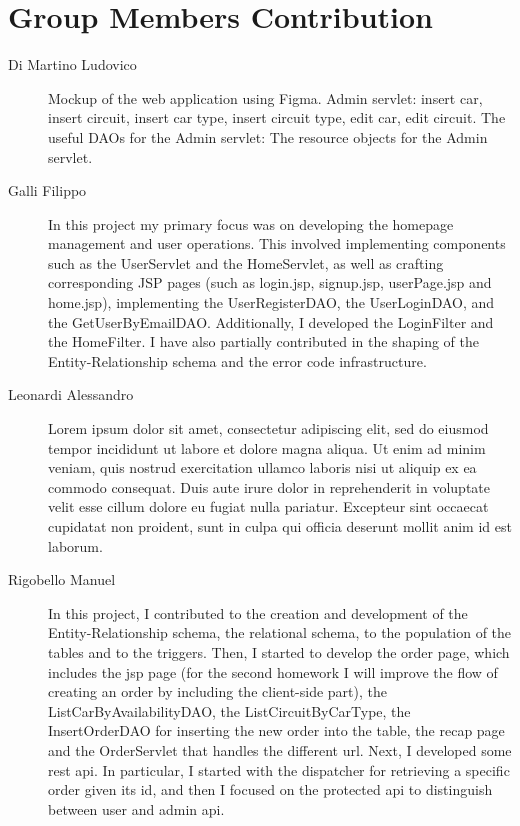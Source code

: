 \section{Group Members Contribution}


\begin{description}
	\item[Di Martino Ludovico] Mockup of the web application using Figma. Admin servlet: insert car, insert circuit, insert car type, insert circuit type, edit car, edit circuit. The useful DAOs for the Admin servlet: The resource objects for the Admin servlet.
	\item[Galli Filippo] In this project my primary focus was on developing the homepage management and user operations. This involved implementing components such as the UserServlet and the HomeServlet, as well as crafting corresponding JSP pages (such as login.jsp, signup.jsp, userPage.jsp and home.jsp), implementing the UserRegisterDAO, the UserLoginDAO, and the GetUserByEmailDAO. Additionally, I developed the LoginFilter and the HomeFilter. I have also partially contributed in the shaping of the Entity-Relationship schema and the error code infrastructure.
	\item[Leonardi Alessandro] Lorem ipsum dolor sit amet, consectetur adipiscing elit, sed do eiusmod tempor incididunt ut labore et dolore magna aliqua. Ut enim ad minim veniam, quis nostrud exercitation ullamco laboris nisi ut aliquip ex ea commodo consequat. Duis aute irure dolor in reprehenderit in voluptate velit esse cillum dolore eu fugiat nulla pariatur. Excepteur sint occaecat cupidatat non proident, sunt in culpa qui officia deserunt mollit anim id est laborum.
	\item[Rigobello Manuel] In this project, I contributed to the creation and development of the Entity-Relationship schema, the relational schema, to the population of the tables and to the triggers. Then, I started to develop the order page, which includes the jsp page (for the second homework I will improve the flow of creating an order by including the client-side part), the ListCarByAvailabilityDAO, the ListCircuitByCarType, the InsertOrderDAO for inserting the new order into the table, the recap page and the OrderServlet that handles the different url. Next, I developed some rest api. In particular, I started with the dispatcher for retrieving a specific order given its id, and then I focused on the protected api to distinguish between user and admin api.

\end{description}
